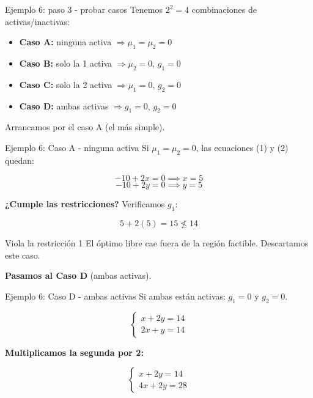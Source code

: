 \documentclass{beamer}
\begin{document}
\begin{frame}{Ejemplo 6: paso 3 - probar casos}
    \small
    Tenemos $2^2 = 4$ combinaciones de activas/inactivas:

    \vspace{0.3em}

    \begin{itemize}
        \item \textbf{Caso A:} ninguna activa $\Rightarrow \mu_1 = \mu_2 = 0$
        \item \textbf{Caso B:} solo la 1 activa $\Rightarrow \mu_2 = 0$, $g_1 = 0$
        \item \textbf{Caso C:} solo la 2 activa $\Rightarrow \mu_1 = 0$, $g_2 = 0$
        \item \textbf{Caso D:} ambas activas $\Rightarrow g_1 = 0$, $g_2 = 0$
    \end{itemize}

    \vspace{0.5em}

    Arrancamos por el caso A (el más simple).
\end{frame}

\begin{frame}{Ejemplo 6: Caso A - ninguna activa}
    \small
    Si $\mu_1 = \mu_2 = 0$, las ecuaciones (1) y (2) quedan:

    \[
    -10 + 2x = 0 \implies x = 5
    \]
    \[
    -10 + 2y = 0 \implies y = 5
    \]

    \vspace{0.5em}

    \textbf{¿Cumple las restricciones?} Verificamos $g_1$:

    \[
    5 + 2(5) = 15 \not\leq 14
    \]

    \vspace{0.3em}

    \begin{alertblock}{Viola la restricción 1}
        El óptimo libre cae fuera de la región factible. Descartamos este caso.
    \end{alertblock}

    \vspace{0.3em}

    \textbf{Pasamos al Caso D} (ambas activas).
\end{frame}

\begin{frame}{Ejemplo 6: Caso D - ambas activas}
    \small
    Si ambas están activas: $g_1 = 0$ y $g_2 = 0$.

    \[
    \begin{cases}
    x + 2y = 14 \\
    2x + y = 14
    \end{cases}
    \]

    \vspace{0.5em}

    \textbf{Multiplicamos la segunda por 2:}

    \[
    \begin{cases}
    x + 2y = 14 \\
    4x + 2y = 28
    \end{cases}
    \]
\end{frame}
\end{document}
